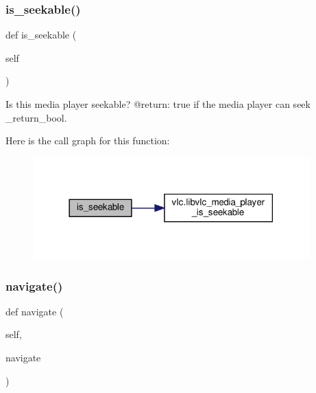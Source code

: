 \subsubsection{\texorpdfstring{is\+\_\+seekable()}{is\_seekable()}}
{\footnotesize\ttfamily def is\+\_\+seekable (\begin{DoxyParamCaption}\item[{}]{self }\end{DoxyParamCaption})}

\begin{DoxyVerb}Is this media player seekable?
@return: true if the media player can seek \libvlc_return_bool.
\end{DoxyVerb}
 Here is the call graph for this function\+:
\nopagebreak
\begin{figure}[H]
\begin{center}
\leavevmode
\includegraphics[width=302pt]{classvlc_1_1_media_player_aae750b3662aafae640c06bffd15b4c7c_cgraph}
\end{center}
\end{figure}
\mbox{\label{classvlc_1_1_media_player_ac74a3e90cc0bce1cb4e98a8c95977ffd}} 
\subsubsection{\texorpdfstring{navigate()}{navigate()}}
{\footnotesize\ttfamily def navigate (\begin{DoxyParamCaption}\item[{}]{self,  }\item[{}]{navigate }\end{DoxyParamCaption})}

